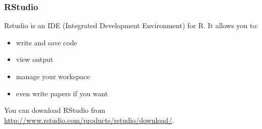 \documentclass[11pt,containsverbatim,handout]{beamer}
\begin{document}
\begin{frame}[fragile]

\frametitle{RStudio}

Rstudio is an IDE (Integrated Development Environment) for R.  It allows you to: 

\begin{itemize}
	\item write and save code 
	\item view output 
	\item manage your workspace
	\item even write papers if you want
\end{itemize} 

You can download RStudio from \url{http://www.rstudio.com/products/rstudio/download/}.

\end{frame}
\end{document}
